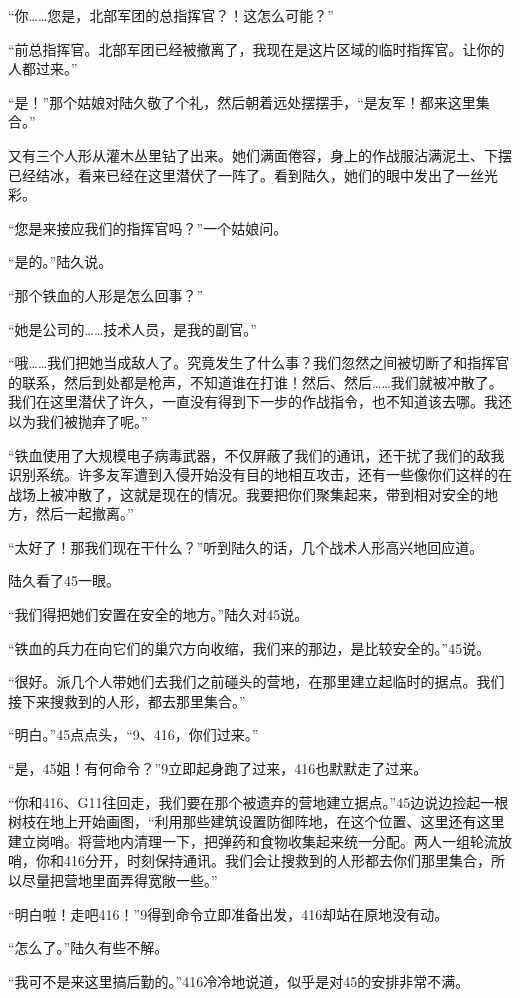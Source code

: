 “你……您是，北部军团的总指挥官？！这怎么可能？”

“前总指挥官。北部军团已经被撤离了，我现在是这片区域的临时指挥官。让你的人都过来。”

“是！”那个姑娘对陆久敬了个礼，然后朝着远处摆摆手，“是友军！都来这里集合。”

又有三个人形从灌木丛里钻了出来。她们满面倦容，身上的作战服沾满泥土、下摆已经结冰，看来已经在这里潜伏了一阵了。看到陆久，她们的眼中发出了一丝光彩。

“您是来接应我们的指挥官吗？”一个姑娘问。

“是的。”陆久说。

“那个铁血的人形是怎么回事？”

“她是公司的……技术人员，是我的副官。”

“哦……我们把她当成敌人了。究竟发生了什么事？我们忽然之间被切断了和指挥官的联系，然后到处都是枪声，不知道谁在打谁！然后、然后……我们就被冲散了。我们在这里潜伏了许久，一直没有得到下一步的作战指令，也不知道该去哪。我还以为我们被抛弃了呢。”

“铁血使用了大规模电子病毒武器，不仅屏蔽了我们的通讯，还干扰了我们的敌我识别系统。许多友军遭到入侵开始没有目的地相互攻击，还有一些像你们这样的在战场上被冲散了，这就是现在的情况。我要把你们聚集起来，带到相对安全的地方，然后一起撤离。”

“太好了！那我们现在干什么？”听到陆久的话，几个战术人形高兴地回应道。

陆久看了45一眼。

“我们得把她们安置在安全的地方。”陆久对45说。

“铁血的兵力在向它们的巢穴方向收缩，我们来的那边，是比较安全的。”45说。

“很好。派几个人带她们去我们之前碰头的营地，在那里建立起临时的据点。我们接下来搜救到的人形，都去那里集合。”

“明白。”45点点头，“9、416，你们过来。”

“是，45姐！有何命令？”9立即起身跑了过来，416也默默走了过来。

“你和416、G11往回走，我们要在那个被遗弃的营地建立据点。”45边说边捡起一根树枝在地上开始画图，“利用那些建筑设置防御阵地，在这个位置、这里还有这里建立岗哨。将营地内清理一下，把弹药和食物收集起来统一分配。两人一组轮流放哨，你和416分开，时刻保持通讯。我们会让搜救到的人形都去你们那里集合，所以尽量把营地里面弄得宽敞一些。”

“明白啦！走吧416！”9得到命令立即准备出发，416却站在原地没有动。

“怎么了。”陆久有些不解。

“我可不是来这里搞后勤的。”416冷冷地说道，似乎是对45的安排非常不满。

